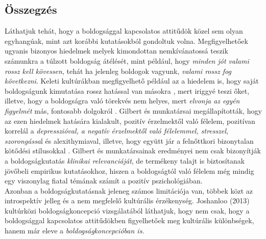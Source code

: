\subsection*{Összegzés}
Láthatjuk tehát, hogy a boldogsággal kapcsolatos attitűdök közel sem olyan egyhangúak, mint azt korábbi kutatásokból gondoltuk volna. Megfigyelhetőek ugyanis bizonyos hiedelmek \cite{joshanloo_weijers_2013} melyek kimondottan nemkívána\-tossá teszik számunkra a túlzott boldogság átélését, mint például, hogy \textit{minden jót valami rossz kell kövessen}, tehát ha jelenleg boldogok vagyunk, \textit{valami rossz fog következni}. Keleti kultúrákban megfigyelhető például az a hiedelem is, hogy saját boldogságunk kimutatása rossz hatással van másokra \cite{joshanloo_weijers_2013}, mert iriggyé teszi őket, illetve, hogy a boldogságra való törekvés nem helyes, mert \textit{elvonja az egyén figyelmét} más, fontosabb dolgokról \cite{joshanloo_weijers_2013}. Gilbert és munkatársai megállapították, hogy az ezen hiedelmek hatására kialakult, pozitív érzelmektől való félelem, pozitívan korrelál a \textit{depresszióval, a negatív érzelmektől való félelemmel, stresszel, szorongássa}l és alexithymiaval, illetve, hogy együtt jár a felnőttkori bizonytalan kötődési stílusokkal \cite{gilbert_mcewan_catarino_baiao_palmeira_2013}. Gilbert és munkatársainak eredményei nem csak bizonyítják a boldogságkutatás \textit{klinikai relevanciáját}, de termékeny talajt is biztosítanak jövőbeli empirikus kutatásokhoz, hiszen a boldogságtól való félelem még mindig egy viszonylag fiatal témának számít a pozitív pszichológiában. \\
Azonban a boldogságkutatásnak jeleneg számos limitációja van, többek közt az introspektív jelleg és a nem megfelelő kultúrális érzékenység. Joshanloo (2013) kultúrközi boldogságkoncepció vizsgálatából láthatjuk, hogy nem csak, hogy a boldog\-sággal kapcsolatos attitűdökben figyelhetőek meg kultúrális különbségek, hanem már eleve a \textit{boldogságkoncepcióban is.}













































